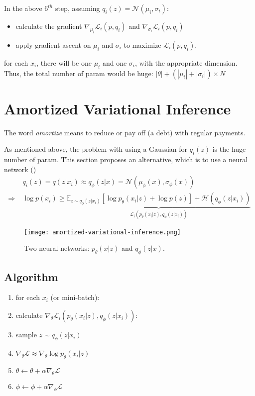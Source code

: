 In the above $6^{th}$ step, assuming $q_i(z) = \mathcal{N}(\mu_i, \sigma_i)$:
\begin{itemize}
	\item calculate the gradient $\nabla_{\mu_i} \mathcal{L}_i (p, q_i)$ and $\nabla_{\sigma_i} \mathcal{L}_i (p, q_i)$
	\item apply gradient ascent on $\mu_i$ and $\sigma_i$ to maximize $\mathcal{L}_i (p, q_i)$.
\end{itemize}

 for each $x_i$, there will be one $\mu_i$ and one $\sigma_i$, with the appropriate dimension. Thus, the total number of \ac{param} would be huge: $|\theta| + (|\mu_i| + |\sigma_i|) \times N$

\section{Amortized Variational Inference}
The word \textit{amortize} means to reduce or pay off (a debt) with regular payments.

As mentioned above, the problem with using a Gaussian for $q_i(z)$ is the huge number of \ac{param}. This section proposes an alternative, which is to use a neural network ()
\begin{align}
	&q_i(z) = q(z | x_i) \approx q_\phi(z|x) = \mathcal{N}(\mu_\phi(x), \sigma_\phi(x))\\
	\Rightarrow\;& \log p(x_i) \geq \underbrace{\mathbb{E}_{z\sim q_\phi(z|x_i)} [ \log p_\theta(x_i|z) + \log p(z) ] + \mathcal{H}(q_\phi(z|x_i))}_{\textstyle \mathcal{L}_i (p_\theta(x_i|z), q_\phi(z|x_i))}
\end{align}

\begin{figure}[hbt!]
	\centering
	\texttt{[image: amortized-variational-inference.png]}
	\caption{Two neural networks: $p_\theta(x|z)$ and $q_\phi(z|x)$.}
	\label{fig:amortized-variational-inference}
\end{figure}

\subsection{Algorithm}
\begin{enumerate}
	\item for each $x_i$ (or mini-batch):
	\item \quad calculate $\nabla_\theta \mathcal{L}_i (p_\theta(x_i|z), q_\phi(z|x_i))$:
	\item \qquad sample $z \sim q_\phi(z|x_i)$
	\item \qquad $\nabla_\theta \mathcal{L} \approx \nabla_\theta \log p_\theta(x_i|z)$
	\item \quad $\theta \leftarrow \theta + \alpha \nabla_\theta \mathcal{L}$
	\item \quad $\phi \leftarrow \phi + \alpha \nabla_\phi \mathcal{L}$
\end{enumerate}

